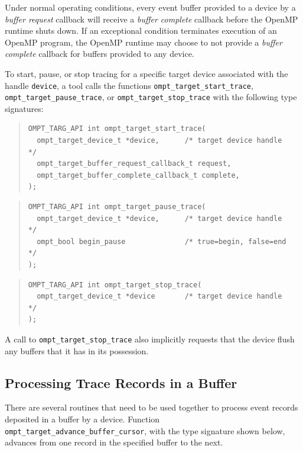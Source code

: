 \documentclass{article}
\begin{document}
Under normal operating conditions, every event buffer provided to a device by a \emph{buffer request} callback will receive a \emph{buffer complete} callback before the OpenMP runtime shuts down. If an exceptional condition terminates  execution of an OpenMP program, the OpenMP runtime may choose to not provide a \emph{buffer complete} callback for buffers provided to any device.

To start, pause, or stop tracing for a specific target device associated with the handle \verb|device|, 
a tool calls the functions \verb|ompt_target_start_trace|, \verb|ompt_target_pause_trace|, or \verb|ompt_target_stop_trace| with the following type signatures:
\begin{quote}
\begin{verbatim}
OMPT_TARG_API int ompt_target_start_trace(
  ompt_target_device_t *device,      /* target device handle      */
  ompt_target_buffer_request_callback_t request,
  ompt_target_buffer_complete_callback_t complete,
);
\end{verbatim}
\end{quote}

\begin{quote}
\begin{verbatim}
OMPT_TARG_API int ompt_target_pause_trace(
  ompt_target_device_t *device,      /* target device handle      */
  ompt_bool begin_pause              /* true=begin, false=end     */
);
\end{verbatim}
\end{quote}

\begin{quote}
\begin{verbatim}
OMPT_TARG_API int ompt_target_stop_trace(
  ompt_target_device_t *device       /* target device handle      */
);
\end{verbatim}
\end{quote}
\noindent
A call to \verb|ompt_target_stop_trace| also implicitly requests that the device flush any buffers that it has in its possession.

\subsection{Processing Trace Records in a Buffer}
\label{sec:record-data}

There are several routines that need to be used together to process %
event records deposited in a buffer by a device. Function \verb|ompt_target_advance_buffer_cursor|, with the type signature shown below, advances from one record in the specified buffer to the next.
\end{document}
